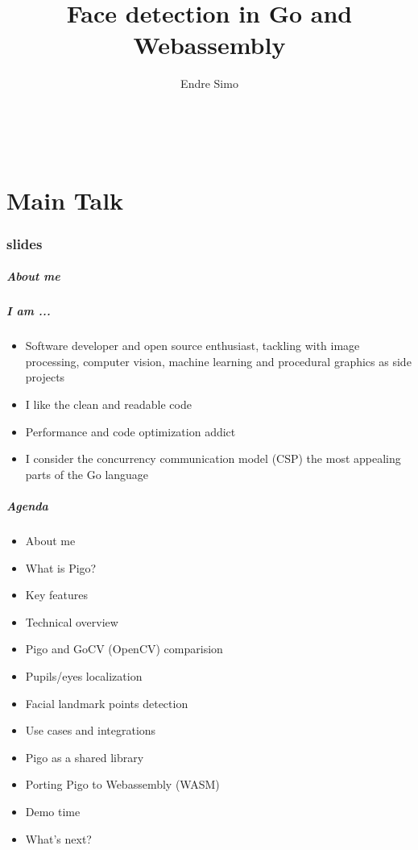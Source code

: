 \documentclass[9pt]{beamer}
\title[Face detection in Go and Webassembly]{Face detection in Go and Webassembly}
\author[Endre Simo]{
 \parbox{0.26\textwidth}{
	\texorpdfstring
	  {
		\centering
 		Endre Simo \\
 		\myblue{\href{https://esimov.com}{\texttt{https://esimov.com}}} \\
 		\myblue{\href{https://github.com/esimov}{\texttt{https://github.com/esimov}}} \\
 		\myblue{\href{https://twitter/simo_endre}{\texttt{https://twitter/simo\_endre}}} \\
 	  }
	{Endre Simo}
}
 }
\begin{document}
\frame{\titlepage
}

\part<presentation>{Main Talk}

\section[slides]{slides}

\begin{frame}[fragile]
\frametitle{About me}


\end{frame}

\begin{frame}[fragile]
\frametitle{I am ...}


\begin{itemize}
\item Software developer and open source enthusiast, tackling with image processing, computer vision, machine learning and procedural graphics as side projects
\item I like the clean and readable code
\item Performance and code optimization addict
\item I consider the concurrency communication model (CSP) the most appealing parts of the Go language
\end{itemize}


\end{frame}

\begin{frame}[fragile]
\frametitle{Agenda}


\begin{itemize}
\item About me
\item What is Pigo?
\item Key features
\item Technical overview
\item Pigo and GoCV (OpenCV) comparision
\item Pupils/eyes localization
\item Facial landmark points detection
\item Use cases and integrations
\item Pigo as a shared library
\item Porting Pigo to Webassembly (WASM)
\item Demo time
\item What's next?
\end{itemize}


\end{frame}
\end{document}
